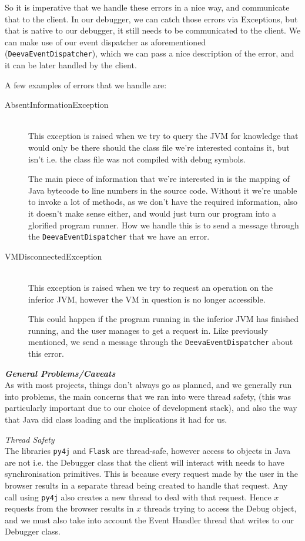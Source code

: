 \documentclass[11pt, a4paper]{article}
\begin{document}
So it is imperative that we handle these errors in a nice way, and communicate that to the client.
In our debugger, we can catch those errors via Exceptions, but that is native to our debugger, it still needs to be communicated to the client.
We can make use of our event dispatcher as aforementioned (\texttt{DeevaEventDispatcher}), which we can pass a nice description of the error, and it can be later handled by the client.

A few examples of errors that we handle are:
\begin{description}
  \item[AbsentInformationException]\hfill\\
    This exception is raised when we try to query the JVM for knowledge that would only be there should the class file we're interested contains it, but isn't i.e. the class file was not compiled with debug symbols.

    The main piece of information that we're interested in is the mapping of Java bytecode to line numbers in the source code.
    Without it we're unable to invoke a lot of methods, as we don't have the required information, also it doesn't make sense either, and would just turn our program into a glorified program runner.
    How we handle this is to send a message through the \texttt{DeevaEventDispatcher} that we have an error.

  \item[VMDisconnectedException]\hfill\\
    This exception is raised when we try to request an operation on the inferior JVM, however the VM in question is no longer accessible.

    This could happen if the program running in the inferior JVM has finished running, and the user manages to get a request in.
    Like previously mentioned, we send a message through the \texttt{DeevaEventDispatcher} about this error.
\end{description}

\textbf{\emph{General Problems/Caveats}}\\
As with most projects, things don't always go as planned, and we generally run into problems, the main concerns that we ran into were thread safety, (this was particularly important due to our choice of development stack), and also the way that Java did class loading and the implications it had for us.

\emph{Thread Safety}\\
The libraries \texttt{py4j} and \texttt{Flask} are thread-safe, however access to objects in Java are not i.e. the Debugger class that the client will interact with needs to have synchronisation primitives.
This is because every request made by the user in the browser results in a separate thread being created to handle that request.
Any call using \texttt{py4j} also creates a new thread to deal with that request.
Hence $x$ requests from the browser results in $x$ threads trying to access the Debug object, and we must also take into account the Event Handler thread that writes to our Debugger class.
\end{document}
